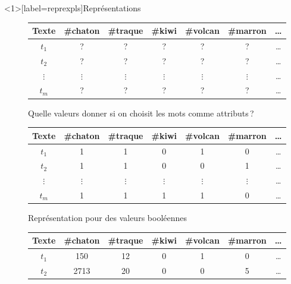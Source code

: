 \documentclass[../allslides.tex]{subfiles}
\begin{document}
\begin{frame}<1>[label=reprexpls]{Représentations}
	\begin{overprint}
			\begin{figure}
				\begin{tabular}{c*{5}{c}c}
					\toprule
					\textbf{Texte}	& {\textbf{\#chaton}}	& {\textbf{\#traque}}	& {\textbf{\#kiwi}}	& {\textbf{\#volcan}}	& {\textbf{\#marron}}	& {…}\\
					\midrule
					\(t_1\)	& ?	& ?	& ?	& ?	& ?	& …\\
					\(t_2\)	& ?	& ?	& ?	& ?	& ?	& …\\
					\(⋮\)	& \multicolumn{1}{c}{\(⋮\)}	& \multicolumn{1}{c}{\(⋮\)}	& \multicolumn{1}{c}{\(⋮\)}	& \multicolumn{1}{c}{\(⋮\)}	& \multicolumn{1}{c}{\(⋮\)}	& …\\
					\(t_m\)	& ?	& ?	& ?	& ?	& ?	& …\\
					\bottomrule
				\end{tabular}
				\caption{Quelle valeurs donner si on choisit les mots comme attributs ?}
			\end{figure}
			\begin{figure}
				\begin{tabular}{c*{5}{c}c}
					\toprule
					\textbf{Texte}	& {\textbf{\#chaton}}	& {\textbf{\#traque}}	& {\textbf{\#kiwi}}	& {\textbf{\#volcan}}	& {\textbf{\#marron}}	& {…}\\
					\midrule
					\(t_1\)	& 1	& 1	& 0	& 1	& 0	& …\\
					\(t_2\)	& 1	& 1	& 0	& 0	& 1	& …\\
					\(⋮\)	& \multicolumn{1}{c}{\(⋮\)}	& \multicolumn{1}{c}{\(⋮\)}	& \multicolumn{1}{c}{\(⋮\)}	& \multicolumn{1}{c}{\(⋮\)}	& \multicolumn{1}{c}{\(⋮\)}	& …\\
					\(t_m\)	& 1	& 1	& 1	& 1	& 0	& …\\
					\bottomrule
				\end{tabular}
				\caption{Représentation pour des valeurs booléennes}
			\end{figure}
			\begin{figure}
				\begin{tabular}{c*{5}{S[table-format=4.0]}c}
					\toprule
					\textbf{Texte}	& {\textbf{\#chaton}}	& {\textbf{\#traque}}	& {\textbf{\#kiwi}}	& {\textbf{\#volcan}}	& {\textbf{\#marron}}	& {…}\\
					\midrule
					\(t_1\)	& 150	& 12	& 0	& 1	& 0	& …\\
					\(t_2\)	& 2713	& 20	& 0	& 0	& 5	& …\\

\end{tabular}
\end{figure}
\end{overprint}
\end{frame}
\end{document}

